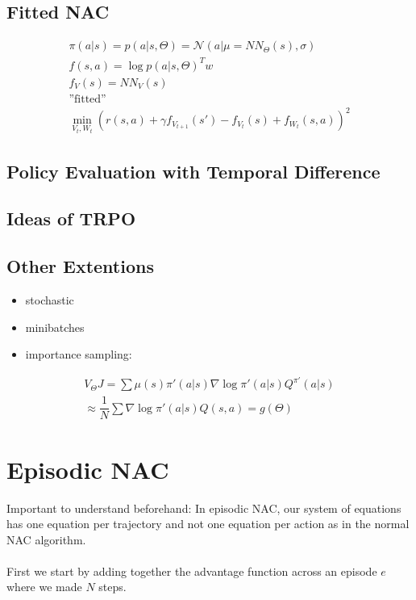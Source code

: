 \documentclass{article}
\newcommand{\x}{\item}
\begin{document}
\subsection{Fitted NAC}

\begin{align}
	\pi(a|s) = p(a|s, \Theta) = \mathcal{N}(a|\mu = NN_{\Theta}(s), \sigma) \\
	f(s,a) = \log p(a|s, \Theta)^T w \\
	f_V(s) = NN_V(s) \\
	\text{''fitted''}\\
	\min_{V_t, W_t} (r(s,a) + \gamma f_{V_{t+1}}(s') - f_{V_t}(s) + f_{W_t}(s,a))^2
\end{align}

\subsection{Policy Evaluation with Temporal Difference}
\cite{dann2014policy}


\subsection{Ideas of TRPO}




\subsection{Other Extentions}

\begin{itemize}
	\x stochastic
	\x minibatches
	\x importance sampling:
\end{itemize}

\begin{align}
	V_{\Theta} J = \sum \mu(s) \pi'(a|s) \nabla \log \pi'(a|s) Q^{\pi'}(a|s) \\
	\approx \dfrac{1}{N} \sum \nabla \log \pi'(a|s) Q(s,a) = g(\Theta)
\end{align}





\section{Episodic NAC}
Important to understand beforehand: In episodic NAC, our system of equations has one equation per trajectory and not one equation per action as in the normal NAC algorithm.
\\\\
First we start by adding together the advantage function across an episode $e$ where we made $N$ steps.
\end{document}
